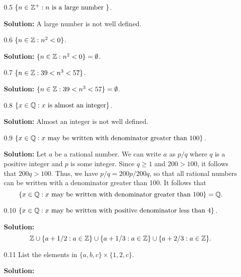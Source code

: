 \begin{enumerate}
   \item[0.5] $\{n \in \mathbb{Z}^+ : n \mbox{ is a large number }\}$.

      \textbf{Solution:} A large number is not well defined.
   \item[0.6] $\{n \in \mathbb{Z} : n^2 < 0\}$.

      \textbf{Solution:} $\{n \in \mathbb{Z} : n^2 < 0\} = \emptyset$.
   \item[0.7] $\{n \in \mathbb{Z} : 39 < n^3 < 57\}$.

      \textbf{Solution:} $\{n \in \mathbb{Z} : 39 < n^3 < 57\} = \emptyset$.
   \item[0.8] $\{x \in \mathbb{Q} : x \mbox{ is almost an integer}\}$.

      \textbf{Solution:} Almost an integer is not well defined.
   \item[0.9] $\{x \in \mathbb{Q} : x \mbox{ may be written with denominator greater 
                 than } 100\}$.

      \textbf{Solution:} Let $a$ be a rational number. We can write $a$ as
      $p/q$ where $q$ is a positive integer and $p$ is some integer. Since
      $q \ge 1$ and $200 > 100$, it follows that $200q > 100$. Thus, we have
      $p/q = 200p/200q$, so that all rational numbers can be written with a
      denominator greater than 100. It follows that
      $$\{x \in \mathbb{Q} : x \mbox{ may be written with denominator greater than }
        100\} = \mathbb{Q}.$$
   \item[0.10] $\{x \in \mathbb{Q} : x \mbox{ may be written with positive denominator 
                 less than } 4\}$.

      \textbf{Solution:} 
      $$\mathbb{Z} \cup \{a + 1/2 : a \in \mathbb{Z}\} \cup \{a + 1/3 : a \in \mathbb{Z}\} \cup
        \{a + 2/3 : a \in \mathbb{Z}\}.$$
   \item[0.11] List the elements in $\{a, b, c\} \times \{1, 2,  c\}$.

      \textbf{Solution:}


\end{enumerate}
